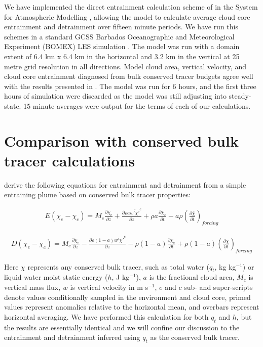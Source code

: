 \documentclass[draft,grl]{AGUTeX}
\begin{document}
\begin{article}
We have implemented the direct entrainment calculation scheme of 
\cite{Romps2010} in the System for Atmospheric Modelling 
\citep[SAM;][]{Khairoutdinov2003}, allowing the model to calculate average 
cloud core entrainment and detrainment over fifteen minute periods.  We have 
run this schemes in a standard GCSS Barbados Oceanographic and Meteorological 
Experiment (BOMEX) LES simulation \citep{Holland1973, Siebesma2003}.  
The model was run with a domain extent of 6.4 km x 6.4 km in the horizontal and 
3.2 km in the vertical at 25 metre grid resolution in all directions.  Model 
cloud area, vertical velocity, and cloud core entrainment diagnosed from bulk 
conserved tracer budgets agree well with the results presented in 
\cite{Siebesma2003}.  The model was run for 6 hours, and the first three hours 
of simulation were discarded as the model was still adjusting into 
steady-state.  15 minute averages were output for the terms of each of our 
calculations.


\section{Comparison with conserved bulk tracer calculations}

\cite{Siebesma1995} derive the following equations for entrainment and 
detrainment from a simple entraining plume based on conserved bulk tracer 
properties:

\begin{eqnarray}
  \label{eq:entrainment}
    E (\chi_e - \chi_c) 
    = M_c \frac{\partial \chi_c}{\partial z}
    + \frac{\partial \rho a \overline{w' \chi'}^c}{\partial z} 
    + \rho a \frac{\partial \chi_c}{\partial t}
    - a \rho \left(\frac{\partial \bar{\chi}}{\partial t}\right)_{forcing}
\end{eqnarray}

\begin{eqnarray}
  \label{eq:detrainment}
    D (\chi_e - \chi_c)
    = M_c \frac{\partial \chi_e}{\partial z}
    - \frac{\partial \rho (1 - a) \overline{w' \chi'}^e}{\partial z}
    - \rho (1 - a) \frac{\partial \chi_e}{\partial t}
    + \rho (1 - a) \left(\frac{\partial \bar{\chi}}{\partial t}\right)_{forcing}
\end{eqnarray}

Here $\chi$ represents any conserved bulk tracer, such as total water ($q_t$, 
kg kg$^{-1}$) or liquid water moist static energy ($h$, J kg$^{-1}$), $a$ is 
the fractional cloud area, $M_c$ is vertical mass flux, $w$ is vertical 
velocity in m s$^{-1}$, $e$ and $c$ sub- and super-scripts denote values 
conditionally sampled in the environment and cloud core, primed values represent 
anomalies relative to the horizontal mean, and overbars represent horizontal 
averaging.  We have performed this calculation for both $q_t$ and $h$, but the 
results are essentially identical and we will confine our discussion to the 
entrainment and detrainment inferred using $q_t$ as the conserved bulk tracer.  


\end{article}
\end{document}
